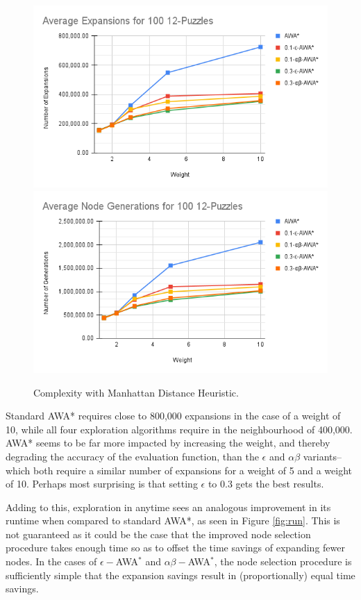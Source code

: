 \begin{figure}
    \includegraphics[width=\linewidth]{media/Average Expansions for 100 12-Puzzles.png}
    \includegraphics[width=\linewidth]{media/Average Node Generations for 100 12-Puzzles.png}
    \caption{Complexity with Manhattan Distance Heuristic.} \label{fig:nodes}
\end{figure}

Standard AWA* requires close to 800,000 expansions in the case of a weight of 10, while all four exploration algorithms require in the neighbourhood of 400,000. AWA* seems to be far more impacted by increasing the weight, and thereby degrading the accuracy of the evaluation function, than the $\epsilon$ and $\alpha\beta$ variants--which both require a similar number of expansions for a weight of 5 and a weight of 10. Perhaps most surprising is that setting $\epsilon$ to 0.3 gets the best results.

Adding to this, exploration in anytime sees an analogous improvement in its runtime when compared to standard AWA*, as seen in Figure \ref{fig:run}. This is not guaranteed as it could be the case that the improved node selection procedure takes enough time so as to offset the time savings of expanding fewer nodes. In the cases of $\epsilon-$AWA$^*$ and $\alpha \beta-$AWA$^*$, the node selection procedure is sufficiently simple that the expansion savings result in (proportionally) equal time savings. 

